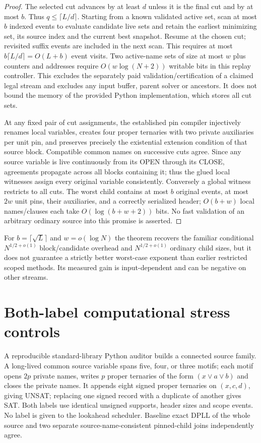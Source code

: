 \documentclass[11pt]{article}
\begin{document}
\begin{proof}
The selected cut advances by at least $d$ unless it is the final cut and by at most $b$. Thus $q\le\lceil L/d\rceil$. Starting from a known validated active set, scan at most $b$ indexed events to evaluate candidate live sets and retain the earliest minimizing set, its source index and the current best snapshot. Resume at the chosen cut; revisited suffix events are included in the next scan. This requires at most $b\lceil L/d\rceil=O(L+b)$ event visits. Two active-name sets of size at most $w$ plus counters and addresses require $O(w\log(N+2))$ writable bits in this replay controller. This excludes the separately paid validation/certification of a claimed legal stream and excludes any input buffer, parent solver or ancestors. It does not bound the memory of the provided Python implementation, which stores all cut sets.

At any fixed pair of cut assignments, the established pin compiler injectively renames local variables, creates four proper ternaries with two private auxiliaries per unit pin, and preserves precisely the existential extension condition of that source block. Compatible common names on successive cuts agree. Since any source variable is live continuously from its OPEN through its CLOSE, agreements propagate across all blocks containing it; thus the glued local witnesses assign every original variable consistently. Conversely a global witness restricts to all cuts. The worst child contains at most $b$ original events, at most $2w$ unit pins, their auxiliaries, and a correctly serialized header; $O(b+w)$ local names/clauses each take $O(\log(b+w+2))$ bits. No fast validation of an arbitrary ordinary source into this promise is asserted.
\end{proof}
For $b=\lceil\sqrt L\rceil$ and $w=o(\log N)$ the theorem recovers the familiar conditional $N^{1/2+o(1)}$ block/candidate overhead and $N^{1/2+o(1)}$ ordinary child sizes, but it does not guarantee a strictly better worst-case exponent than earlier restricted scoped methods. Its measured gain is input-dependent and can be negative on other streams.

\section{Both-label computational stress controls}
A reproducible standard-library Python auditor builds a connected source family. A long-lived common source variable spans five, four, or three motifs; each motif opens $2p$ private names, writes $p$ proper ternaries of the form $(x\vee a\vee b)$ and closes the private names. It appends eight signed proper ternaries on $(x,c,d)$, giving UNSAT; replacing one signed record with a duplicate of another gives SAT. Both labels use identical unsigned supports, header sizes and scope events. No label is given to the lookahead scheduler. Baseline exact DPLL of the whole source and two separate source-name-consistent pinned-child joins independently agree.
\end{document}
